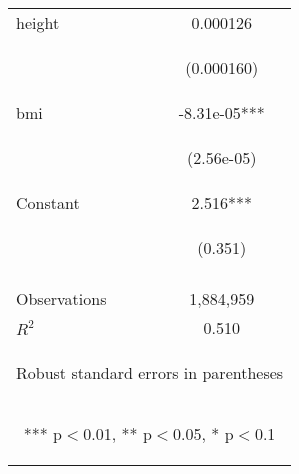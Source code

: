 \documentclass[]{article}
\begin{document}
\begin{center}
\begin{tabular}{lc}
height & 0.000126 \\
\vspace{4pt} & \begin{footnotesize}(0.000160)\end{footnotesize} \\
bmi & -8.31e-05*** \\
\vspace{4pt} & \begin{footnotesize}(2.56e-05)\end{footnotesize} \\
Constant & 2.516*** \\
 & \begin{footnotesize}(0.351)\end{footnotesize} \\
\vspace{4pt} & \begin{footnotesize}\end{footnotesize} \\
Observations & 1,884,959 \\
 $R^2$ & 0.510 \\ \hline
\multicolumn{2}{c}{\begin{footnotesize} Robust standard errors in parentheses\end{footnotesize}} \\
\multicolumn{2}{c}{\begin{footnotesize} *** p$<$0.01, ** p$<$0.05, * p$<$0.1\end{footnotesize}} \\
\end{tabular}
\end{center}
\end{document}
